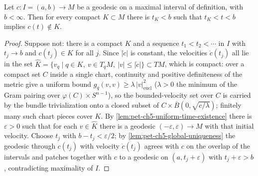 \begin{proposition}
  \label{prop:pet-ch5-leaves-compact-set}
  \leanok
  Let $c:I=(a,b)\to M$ be a geodesic on a maximal interval of definition, with
  $b<\infty$. Then for every compact $K\subset M$ there is $t_K<b$ such that
  $t_K<t<b$ implies $c(t)\notin K$.
\end{proposition}
\begin{proof}
  Suppose not: there is a compact $K$ and a sequence $t_1<t_2<\cdots$ in $I$ with
  $t_j\to b$ and $c(t_j)\in K$ for all $j$. Since $|\dot c|$ is constant, the
  velocities $\dot c(t_j)$ all lie in the set
  $\hat K=\{v_q\mid q\in K,\ v\in T_qM,\ |v|\le|\dot c|\}\subset TM$, which is
  compact: over a compact set $C$ inside a single chart, continuity and positive
  definiteness of the metric give a uniform bound $g_q(v,v)\ge\lambda\,|v|_{\mathrm{eucl}}^2$
  ($\lambda>0$ the minimum of the Gram pairing over $\varphi(C)\times S^{n-1}$), so the
  bounded-velocity set over $C$ is carried by the bundle trivialization onto a closed
  subset of $C\times\overline{B}(0,\sqrt{c/\lambda})$; finitely many such chart pieces
  cover $K$. By
  \cref{lem:pet-ch5-uniform-time-existence} there is $\varepsilon>0$ such that for
  each $v\in\hat K$ there is a geodesic $(-\varepsilon,\varepsilon)\to M$ with that initial
  velocity. Choose $t_j$ with $b-t_j<\varepsilon/2$; by
  \cref{lem:pet-ch5-global-uniqueness} the geodesic through $c(t_j)$ with velocity
  $\dot c(t_j)$ agrees with $c$ on the overlap of the intervals and patches together
  with $c$ to a geodesic on $(a, t_j+\varepsilon)$ with $t_j+\varepsilon>b$, contradicting
  maximality of $I$.
\end{proof}

